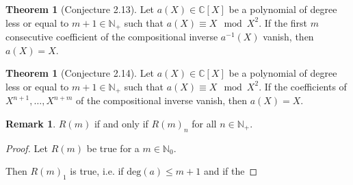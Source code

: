 \documentclass[a4paper]{article}
\theoremstyle{definition}
\newtheorem{theorem}[definition]{Theorem}
\newtheorem*{remark}{Remark}
\begin{document}
\begin{theorem}[Conjecture 2.13]
    Let \(a(X) \in \mathbb{C}[X]\) be a polynomial of degree less or equal to \(m + 1 \in \mathbb{N}_+\) such that \(a(X) \equiv X \mod{X^2}\). If the first \(m\) consecutive coefficient of the compositional inverse \(a^{-1}(X)\) vanish, then \(a(X) = X\).
\end{theorem}

\begin{theorem}[Conjecture 2.14]
    Let \(a(X) \in \mathbb{C}[X]\) be a polynomial of degree less or equal to \(m + 1 \in \mathbb{N}_+\) such that \(a(X) \equiv X \mod{X^2}\). If the coefficients of \(X^{n+1}, \ldots, X^{n+m}\) of the compositional inverse vanish, then \(a(X) = X\).
\end{theorem}

\begin{remark}
    \(R(m)\) if and only if \(R(m)_n\) for all \(n \in \mathbb{N}_+\).
\end{remark}


\begin{proof}
    Let \(R(m)\) be true for a \(m \in \mathbb{N}_0\).

    Then \(R(m)_1\) is true, i.e. if \(\text{deg}(a) \leq m + 1\) and if the
\end{proof}
\end{document}
